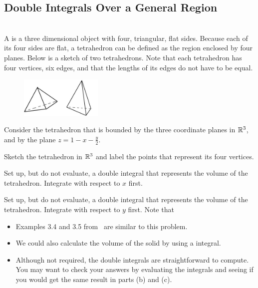 
\subsection{Double Integrals Over a General Region}

\BEN
\item %
 \\
A  is a three dimensional object with four, triangular, flat sides. Because each of its four sides are flat, a tetrahedron can be defined as the region enclosed by four planes. Below is a sketch of two tetrahedrons. Note that each tetrahedron has four vertices, six edges, and that the lengths of its edges do not have to be equal.
\begin{figure}[H]
  \vspace{-1pt}
  \begin{center}
    \includegraphics[width=0.35\textwidth]{ImgTetrahedrons.jpg}
  \end{center}
\end{figure}
Consider the tetrahedron that is bounded by the three coordinate planes in $\mathbb{R}^3$, and by the plane $z = 1 - x - \frac{y}{2}$.
\BEN
\item Sketch the tetrahedron in $\mathbb{R}^3$ and label the points that represent its four vertices. 
\item Set up, but do not evaluate, a double integral that represents the volume of the tetrahedron. Integrate with respect to $x$ first. 
\item Set up, but do not evaluate, a double integral that represents the volume of the tetrahedron. Integrate with respect to $y$ first. 
\EEN
Note that
\begin{itemize}
\item Examples 3.4 and 3.5 from \VCT \ are similar to this problem. 
\item We could also calculate the volume of the solid by using a  integral. 
\item Although not required, the double integrals are straightforward to compute. You may want to check your answers by evaluating the integrals and seeing if you would get the same result in parts (b) and (c). 
\end{itemize}
